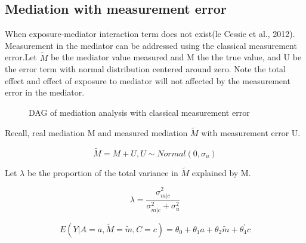 \documentclass{article}
\begin{document}
\subsection{Mediation with measurement error}

When exposure-mediator interaction term does not exist(le Cessie et al., 2012). Measurement in the mediator can be addressed using the classical measurement error.Let $\tilde M $ be the mediator value measured and M the the true value, and U be the error term with normal distribution centered around zero. Note the total effect and effect of exposure to mediator will not affected by the measurement error in the mediator. 


\begin{figure}[h]
\centering
{}
\caption{DAG of mediation analysis with classical measurement error }
\label{dag1}
\end{figure}

Recall, real mediation M and measured mediation $\tilde M$ with measurement error U.\newline

\begin{equation}
\tilde M = M + U, U \sim Normal(0, \sigma_u)
\end{equation}

Let $\lambda$ be the proportion of the total variance in $\tilde M $ explained by M. 


\begin{equation}
\lambda = \frac{\sigma_{m|c}^2}{\sigma_{m|c}^2 + \sigma_{u}^2}
\end{equation}

\begin{equation}
E(Y | A = a, \tilde M = \tilde m, C =c) = \theta_0+\theta_1 a+ \theta_2 \tilde m  + \theta_4^{'} c
\end{equation}
\end{document}

